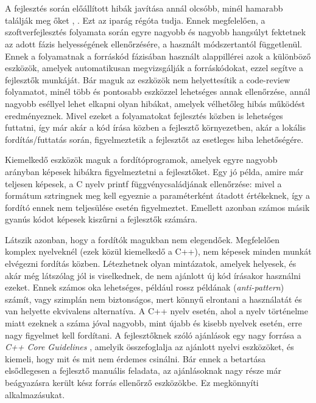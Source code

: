 \chapter{\bevezetes}

A fejlesztés során előállított hibák javítása annál olcsóbb, minél hamarabb találják meg őket \cite{boehmSoftwareEngineeringEconomics1984}, \cite{boehmSoftwareDefectReduction2005}.
Ezt az iparág régóta tudja.
Ennek megfelelően, a szoftverfejlesztés folyamata során egyre nagyobb és nagyobb hangsúlyt fektetnek az adott fázis helyességének ellenőrzésére, a használt módszertantól függetlenül.
Ennek a folyamatnak a forráskód fázisában használt alappillérei azok a különböző eszközök, amelyek automatikusan megvizsgálják a forráskódokat, ezzel segítve a fejlesztők munkáját.
Bár maguk az eszközök nem helyettesítik a code-review folyamatot, minél több és pontosabb eszközzel lehetséges annak ellenőrzése, annál nagyobb eséllyel lehet elkapni olyan hibákat, amelyek vélhetőleg hibás működést eredményeznek.
Mivel ezeket a folyamatokat fejlesztés közben is lehetséges futtatni, így már akár a kód írása közben a fejlesztő környezetben, akár a lokális fordítás/futtatás során, figyelmeztetik a fejlesztőt az esetleges hiba lehetőségére.

Kiemelkedő eszközök maguk a fordítóprogramok, amelyek egyre nagyobb arányban képesek hibákra figyelmeztetni a fejlesztőket.
Egy jó példa, amire már teljesen képesek, a C nyelv printf \cite{theopengroupFprintf2024} függvénycsaládjának ellenőrzése: mivel a formátum sztringnek meg kell egyeznie a paraméterként átadott értékeknek, így a fordító ennek nem teljesülése esetén figyelmeztet.
Emellett azonban számos másik gyanús kódot képesek kiszűrni a fejlesztők számára.

Látszik azonban, hogy a fordítók magukban nem elegendőek.
Megfelelően komplex nyelveknél (ezek közül kiemelkedő \pl a C++), nem képesek minden munkát elvégezni fordítás közben.
Létezhetnek olyan mintázatok, amelyek helyesek, és akár még látszólag jól is viselkednek, de nem ajánlott új kód írásakor használni ezeket.
Ennek számos oka lehetséges, például rossz példának ({\it anti-pattern}) számít, vagy szimplán nem biztonságos, mert könnyű elrontani a használatát és van helyette ekvivalens alternatíva.
A C++ nyelv esetén, ahol a nyelv történelme miatt ezeknek a száma jóval nagyobb, mint újabb és kisebb nyelvek esetén, erre nagy figyelmet kell fordítani.
A fejlesztőknek szóló ajánlások egy nagy forrása a {\it C++ Core Guidelines} \cite{bjarnestroustrupCoreGuidelines2026}, amelyik összefoglalja az ajánlott nyelvi eszközöket, és kiemeli, hogy mit és mit nem érdemes csinálni.
Bár ennek a betartása elsődlegesen a fejlesztő manuális feladata, az ajánlásoknak nagy része már beágyazásra került kész forrás ellenőrző eszközökbe.
Ez megkönnyíti alkalmazásukat.

